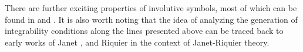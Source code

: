 \begin{comment}
Thus, if the symbol of a given PDE is involutive, for each equation, we can split the possible prolongations into two disjoint sets, those w.r.t.\ a multiplicative variable that are hence free of integrability conditions, and those w.r.t.\ a non-multiplicative variable which if the resulting equation is independent of the PDE must produce integrability conditions.
\end{comment}

There are further exciting properties of involutive symbols, most of which can be found in \cite{seiler2009involution} and \cite{seiler2009involution}. It is also worth noting that the idea of analyzing the generation of integrability conditions along the lines presented above can be traced back to early works of Janet \cite{janet1920systemes}, \cite{MSM_1927__21__1_0} and Riquier \cite{Riquier} in the context of Janet-Riquier theory.

